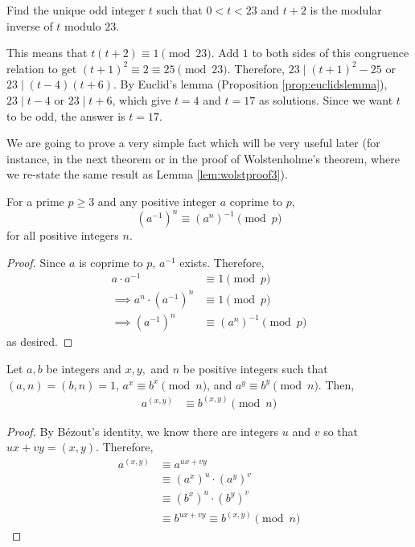 \documentclass{subfile}
\begin{document}
	\begin{problem}
		Find the unique odd integer $t$ such that $0<t<23$ and $t+2$ is the modular inverse of $t$ modulo $23$.
	\end{problem}

	\begin{solution}
		This means that $t(t+2)\equiv 1 \pmod{23}$. Add $1$ to both sides of this congruence relation to get $(t+1)^2 \equiv 2 \equiv 25\pmod{23}$. Therefore, $23\mid (t+1)^2-25$ or $23\mid (t-4)(t+6)$. By Euclid's lemma (Proposition \ref{prop:euclidslemma}), $23\mid t-4$ or $23\mid t+6$, which give $t=4$ and $t=17$ as solutions. Since we want $t$ to be odd, the answer is $t=17$.
	\end{solution}

We are going to prove a very simple fact which will be very useful later (for instance, in the next theorem or in the proof of Wolstenholme's theorem, where we re-state the same result as Lemma \ref{lem:wolstproof3}).

	\begin{proposition}\label{prop:inversepower}
		For a prime $p\geq 3$ and any positive integer $a$ coprime to $p$,
		\[ (a^{-1})^n \equiv (a^n)^{-1} \pmod p\]
		for all positive integers $n$.
	\end{proposition}

	\begin{proof}
		Since $a$ is coprime to $p$, $a^{-1}$ exists. Therefore,
			\begin{align*}
				a \cdot a^{-1}
					& \equiv 1 \pmod p\\
				\implies a^n \cdot (a^{-1})^n
					& \equiv 1 \pmod p\\
				\implies (a^{-1})^n
					& \equiv (a^n)^{-1} \pmod p
			\end{align*}
		as desired.
	\end{proof}



	\begin{theorem}\label{thm:modgcd}
	Let $a,b$ be integers and $x,y,$ and $n$ be positive integers such that $(a,n)=(b,n)=1$,  $a^x\equiv b^x\pmod n$, and $a^y\equiv b^y\pmod n$. Then,
	\begin{align*}
		a^{(x,y)} & \equiv b^{(x,y)}\pmod n
	\end{align*}
\end{theorem}

\begin{proof}
	By B\'{e}zout's identity, we know there are integers $u$ and $v$ so that $ux+vy=(x,y)$. Therefore,
	\begin{align}
		a^{(x,y)} &\equiv a^{ux+vy}\nonumber\\
		&\equiv \left(a^x\right)^u \cdot \left(a^y\right)^v\\
		& \equiv \left(b^x\right)^u \cdot \left(b^y\right)^v\label{eq:modgcd}\\
		&\equiv b^{ux+vy} \equiv b^{(x,y)} \pmod n\nonumber
	\end{align}
\end{proof}
\end{document}

